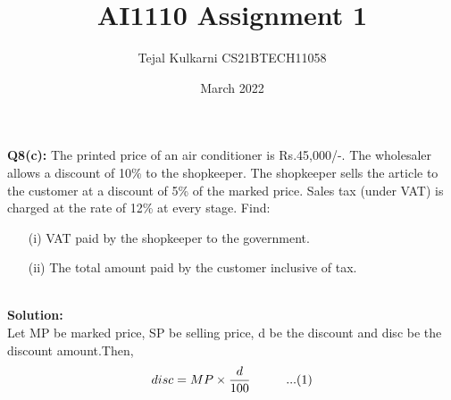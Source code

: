 \documentclass[12pt, twocolumn]{article}
\title{AI1110 Assignment 1}
\author{Tejal Kulkarni CS21BTECH11058}
\date{March 2022}
\begin{document}
\maketitle

\textbf{Q8(c):} The printed price of an air conditioner is  Rs.45,000/-. The wholesaler allows a discount of 10\% to the shopkeeper. The shopkeeper sells the article to the customer at a discount of 5\% of the marked price. Sales tax (under VAT) is charged at the rate of 12\% at every stage. Find:
\begin{enumerate}
\item[(i)]VAT paid by the shopkeeper to the government.
\item[(ii)]The total amount paid by the customer inclusive of tax.\\ \\
\end{enumerate}
\textbf{Solution:}\\
Let MP be marked price, SP be selling price, d be the discount and disc be the discount amount.Then, \\
\begin{equation*}
 disc = MP\times\frac{d}{100} \hspace{1cm}...(1)\\ 
\end{equation*}
\end{document}
